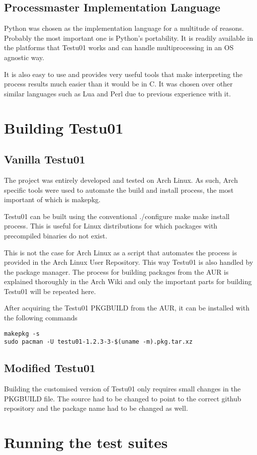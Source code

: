 \subsection{Processmaster Implementation Language}
Python was chosen as the implementation language for a multitude of reasons. Probably the most important one is Python's portability. It is readily available in the platforms that Testu01 works and can handle multiprocessing in an OS agnostic way.

It is also easy to use and provides very useful tools that make interpreting the process results much easier than it would be in C. It was chosen over other similar languages such as Lua and Perl due to previous experience with it.

\section{Building Testu01}
\subsection{Vanilla Testu01}
The project was entirely developed and tested on Arch Linux. As such, Arch specific tools were used to automate the build and install process, the most important of which is makepkg.

Testu01 can be built using the conventional ./configure make make install process. This is useful for Linux distributions for which packages with precompiled binaries do not exist. 

This is not the case for Arch Linux as a script that automates the process is provided in the Arch Linux User Repository. This way Testu01 is also handled by the package manager. The process for building packages from the AUR is explained thoroughly in the Arch Wiki\cite{archwiki-aur} and only the important parts for building Testu01 will be repeated here.

After acquiring the Testu01 PKGBUILD from the AUR\cite{testu01-aur}, it can be installed with the following commands
\begin{verbatim}
makepkg -s
sudo pacman -U testu01-1.2.3-3-$(uname -m).pkg.tar.xz
\end{verbatim}

\subsection{Modified Testu01}
Building the customised version of Testu01 only requires small changes in the PKGBUILD file. The source had to be changed to point to the correct github repository and the package name had to be changed as well.


\section{Running the test suites}
